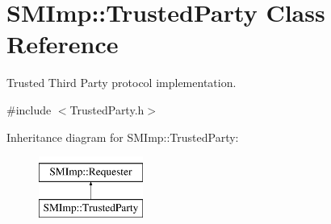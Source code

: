 \hypertarget{classSMImp_1_1TrustedParty}{}\section{S\+M\+Imp\+:\+:Trusted\+Party Class Reference}
\label{classSMImp_1_1TrustedParty}


Trusted Third Party protocol implementation.  




{\ttfamily \#include $<$Trusted\+Party.\+h$>$}

Inheritance diagram for S\+M\+Imp\+:\+:Trusted\+Party\+:\begin{figure}[H]
\begin{center}
\leavevmode
\includegraphics[height=2.000000cm]{classSMImp_1_1TrustedParty}
\end{center}
\end{figure}
